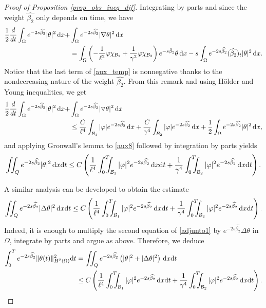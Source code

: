 \documentclass[preprint,10pt]{article}
\numberwithin{equation}{section}
\numberwithin{theorem}{section}
\def\dx{\,\textnormal{d}x}
\def\dt{\textnormal{d}t}
\newcommand\csin[1]{\chi_{#1}}
\def\dx{\,\textnormal{d}x}
\def\dt{\textnormal{d}t}
\begin{document}
{\begin{proof}[Proof of Proposition \ref{prop_obs_ineq_dif}]
Integrating by parts and since the weight $\widehat{\beta_2}$ only depends on time, we have
%
\begin{equation}
\label{aux_temp}
\begin{split}
\frac12\frac{d}{dt}\int_{\Omega}e^{-2s\widehat{\beta_2}}|\theta|^2\dx+&\int_{\Omega}e^{-2s\widehat{\beta_2}}|\nabla \theta|^2\dx\\
&=\int_{\Omega}\left(-\frac{1}{\ell^2}\varphi\csin{\mathcal B_1}+\frac{1}{\gamma^2}\varphi \csin{\mathcal B_2}\right)e^{-s\hat{\beta}_2}\theta\dx-s\int_{\Omega}e^{-2s\widehat{\beta_2}}(\widehat{\beta_2})_t|\theta|^2\dx.
\end{split}
\end{equation}
%
 Notice that the last term of \eqref{aux_temp} is nonnegative thanks to the nondecreasing nature of the weight $\widehat{\beta_2}$. From this remark and using H\"older and Young inequalities, we get
 \begin{equation}
\label{aux8}
\begin{split}
\frac12\frac{d}{dt}\int_{\Omega}e^{-2s\widehat{\beta}_2}|\theta|^2\dx+&\int_{\Omega}e^{-2s\widehat{\beta_2}}|\triangledown \theta|^2\dx\\
&\leq \frac{C}{\ell^4}\int_{\mathcal B_1}|\varphi|e^{-2s\widehat{\beta_2}}\dx+\frac{C}{\gamma^4}\int_{\mathcal B_2}|\varphi|e^{-2s\widehat{\beta_2}}\dx+\frac12\int_{\Omega}e^{-2s\widehat{\beta_2}}|\theta|^2\dx, 
\end{split}
\end{equation}
and applying Gronwall's lemma to \eqref{aux8} followed by integration by parts yields
 \begin{equation}
\label{aux9}
\iint_Q e^{-2s\widehat{\beta_2}}|\theta|^2\dx\dt\leq C\left(\frac{1}{\ell^4}\int_0^T\!\!\!\!\int_{\mathcal B_1}|\varphi|^2e^{-2s\widehat{\beta_2}}\dx\dt+\frac{1}{\gamma^4}\int_0^T\!\!\!\!\int_{\mathcal B_2}|\varphi|^2e^{-2s\widehat{\beta_2}}\dx\dt\right).
\end{equation}
 
A similar analysis can be developed to obtain the estimate
%
\begin{equation}
\label{aux10}
\iint_{Q} e^{-2s\widehat{\beta_2}}|\Delta\theta|^2\dx\dt\leq C\left(\frac{1}{\ell^4}\int_0^T\!\!\!\!\int_{\mathcal B_1}|\varphi|^2e^{-2s\widehat{\beta_2}}\dx\dt+\frac{1}{\gamma^4}\int_0^T\!\!\!\!\int_{\mathcal B_2}|\varphi|^2e^{-2s\widehat{\beta_2}}\dx\dt\right).
\end{equation}
%
Indeed, it is enough to multiply the second equation of \eqref{adjunto1} by $e^{-2s\widehat{\beta_2}}\Delta\theta$ in $\Omega$, integrate by parts and argue as above. Therefore, we deduce
%
\begin{align}\notag 
\int_{0}^Te^{-2s\widehat{\beta_2}}\|\theta(t)\|_{H^2(\Omega)}^2\dt&=\iint_{Q}e^{-2s\widehat{\beta_2}}\left(|\theta|^2+
|\Delta \theta|^2\right)\dx\dt \\ \label{est_theta_h2}
&\leq C\left(\frac{1}{\ell^4}\int_0^T\!\!\!\!\int_{\mathcal B_1}|\varphi|^2e^{-2s\widehat{\beta_2}}\dx\dt+\frac{1}{\gamma^4}\int_0^T\!\!\!\!\int_{\mathcal B_2}|\varphi|^2e^{-2s\widehat{\beta_2}}\dx\dt\right).
\end{align}
%


\end{proof}}
\end{document}
